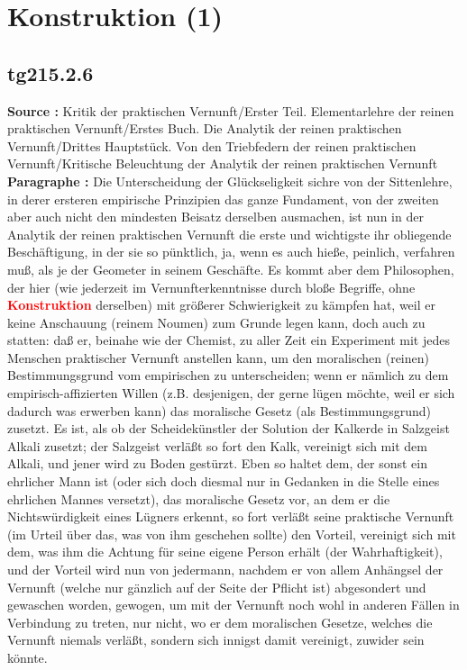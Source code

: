 \documentclass[a4paper,12pt,twoside]{book}
\newcommand{\match}[1]{\textcolor{red}{\textbf{#1}}}
\newcommand{\unnumberedsection}[1]{
	\section*{#1}
	\addcontentsline{toc}{section}{#1}
	\markright{#1}
}
\begin{document}
	\unnumberedsection{Konstruktion (1)} 
	\subsection*{tg215.2.6} 
	\textbf{Source : }Kritik der praktischen Vernunft/Erster Teil. Elementarlehre der reinen praktischen Vernunft/Erstes Buch. Die Analytik der reinen praktischen Vernunft/Drittes Hauptstück. Von den Triebfedern der reinen praktischen Vernunft/Kritische Beleuchtung der Analytik der reinen praktischen Vernunft\\  
	
	\noindent\textbf{Paragraphe : }Die Unterscheidung der Glückseligkeit sichre von der Sittenlehre, in derer ersteren empirische Prinzipien das ganze Fundament, von der zweiten aber auch nicht den mindesten Beisatz derselben ausmachen, ist nun in der Analytik der reinen praktischen Vernunft die erste und wichtigste ihr obliegende Beschäftigung, in der sie so pünktlich, ja, wenn es auch hieße, peinlich, verfahren muß, als je der Geometer in seinem Geschäfte. Es kommt aber dem Philosophen, der hier (wie jederzeit im Vernunfterkenntnisse durch bloße Begriffe, ohne \match{Konstruktion} derselben) mit größerer Schwierigkeit zu kämpfen hat, weil er keine Anschauung  (reinem Noumen) zum Grunde legen kann, doch auch zu statten: daß er, beinahe wie der Chemist, zu aller Zeit ein Experiment mit jedes Menschen praktischer Vernunft anstellen kann, um den moralischen (reinen) Bestimmungsgrund vom empirischen zu unterscheiden; wenn er nämlich zu dem empirisch-affizierten Willen (z.B. desjenigen, der gerne lügen möchte, weil er sich dadurch was erwerben kann) das moralische Gesetz (als Bestimmungsgrund) zusetzt. Es ist, als ob der Scheidekünstler der Solution der Kalkerde in Salzgeist Alkali zusetzt; der Salzgeist verläßt so fort den Kalk, vereinigt sich mit dem Alkali, und jener wird zu Boden gestürzt. Eben so haltet dem, der sonst ein ehrlicher Mann ist (oder sich doch diesmal nur in Gedanken in die Stelle eines ehrlichen Mannes versetzt), das moralische Gesetz vor, an dem er die Nichtswürdigkeit eines Lügners erkennt, so fort verläßt seine praktische Vernunft (im Urteil über das, was von ihm geschehen sollte) den Vorteil, vereinigt sich mit dem, was ihm die Achtung für seine eigene Person erhält (der Wahrhaftigkeit), und der Vorteil wird nun von jedermann, nachdem er von allem Anhängsel der Vernunft (welche nur gänzlich auf der Seite der Pflicht ist) abgesondert und gewaschen worden, gewogen, um mit der Vernunft noch wohl in anderen Fällen in Verbindung zu treten, nur nicht, wo er dem moralischen Gesetze, welches die Vernunft niemals verläßt, sondern sich innigst damit vereinigt, zuwider sein könnte. 
	
\end{document}
